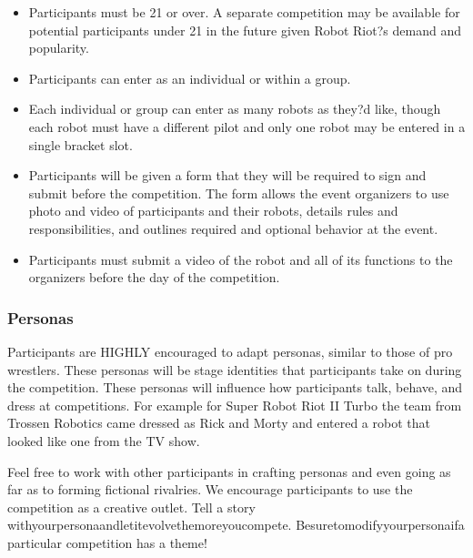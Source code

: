 \documentclass{article}
\begin{document}
		\begin{itemize}
  			\item Participants must be 21 or over. A separate competition may be available for potential participants under 21 in the future given Robot Riot?s demand and popularity.
 			\item Participants can enter as an individual or within a group.
  			\item  Each individual or group can enter as many robots as they?d like, though each robot must have a different pilot and only one robot may be entered in a single bracket slot.
 			\item Participants will be given a form that they will be required to sign and submit before the
competition. The form allows the event organizers to use photo and video of participants and their robots, details rules and responsibilities, and outlines required and optional behavior at the event.
  			\item Participants must submit a video of the robot and all of its functions to the organizers before the day of the competition.
		\end{itemize}

	   \subsubsection {Personas}	
			Participants are HIGHLY encouraged to adapt personas, similar to those of pro wrestlers. These personas will be stage identities that participants take on during the competition. These personas will influence how participants talk, behave, and dress at competitions. For example for Super Robot Riot II Turbo the team from Trossen Robotics came dressed as Rick and Morty and entered a robot that looked like one from the TV show.
			
			Feel free to work with other participants in crafting personas and even going as far as to forming fictional rivalries. We encourage participants to use the competition as a creative outlet. Tell a story withyourpersonaandletitevolvethemoreyoucompete. Besuretomodifyyourpersonaifa particular competition has a theme!

	
\end{document}
